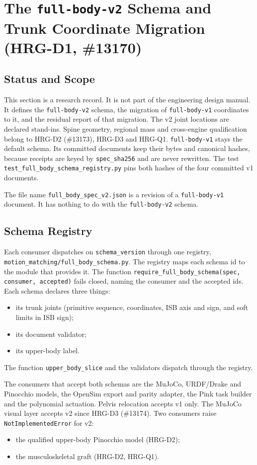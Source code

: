 \documentclass[11pt,a4paper]{article}
\begin{document}
\section{The \texttt{full-body-v2} Schema and Trunk Coordinate Migration (HRG-D1, \#13170)}
\label{sec:full-body-v2}

\subsection{Status and Scope}
This section is a research record. It is not part of the engineering design
manual. It defines the \texttt{full-body-v2} schema, the migration of
\texttt{full-body-v1} coordinates to it, and the residual report of that
migration. The v2 joint locations are declared stand-ins. Spine geometry,
regional mass and cross-engine qualification belong to HRG-D2 (\#13173),
HRG-D3 and HRG-Q1. \texttt{full-body-v1} stays the default schema. Its
committed documents keep their bytes and canonical hashes, because receipts
are keyed by \texttt{spec\_sha256} and are never rewritten. The test
\texttt{test\_full\_body\_schema\_registry.py} pins both hashes of the four
committed v1 documents.

The file name \texttt{full\_body\_spec\_v2.json} is a revision of a
\texttt{full-body-v1} document. It has nothing to do with the
\texttt{full-body-v2} schema.

\subsection{Schema Registry}
Each consumer dispatches on \texttt{schema\_version} through one registry,
\texttt{motion\_matching/full\_body\_schema.py}. The registry maps each schema
id to the module that provides it. The function
\texttt{require\_full\_body\_schema(spec, consumer, accepted)} fails closed,
naming the consumer and the accepted ids. Each schema declares three things:
\begin{itemize}
\item its trunk joints (primitive sequence, coordinates, ISB axis and sign, and
soft limits in ISB sign);
\item its document validator;
\item its upper-body label.
\end{itemize}
The function \texttt{upper\_body\_slice} and the validators dispatch through
the registry.

The consumers that accept both schemas are the MuJoCo, URDF/Drake and
Pinocchio models, the OpenSim export and parity adapter, the Pink task builder
and the polynomial actuation. Pelvis relocation accepts v1 only. The MuJoCo
visual layer accepts v2 since HRG-D3 (\#13174). Two consumers raise
\texttt{NotImplementedError} for v2:
\begin{itemize}
\item the qualified upper-body Pinocchio model (HRG-D2);
\item the musculoskeletal graft (HRG-D2, HRG-Q1).
\end{itemize}
\end{document}
